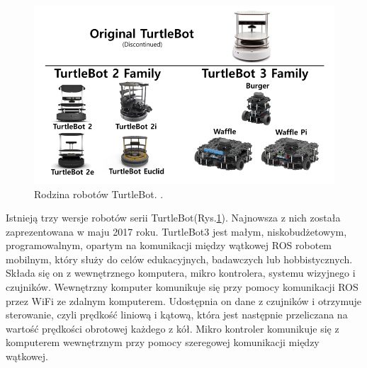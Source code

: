 \begin{figure}[ht]
	\centering
	\includegraphics[scale=0.7]{turtlebot.png}
	\caption{Rodzina robotów TurtleBot. \cite{turtlebot}.}
	\label{fig:turtlebot}
\end{figure}  

Istnieją trzy wersje robotów serii TurtleBot(Rys.\ref{fig:turtlebot}). Najnowsza z nich została zaprezentowana w maju 2017 roku. TurtleBot3 jest małym, niskobudżetowym, programowalnym, opartym na komunikacji między wątkowej ROS robotem mobilnym, który służy do celów edukacyjnych, badawczych lub hobbistycznych.  Składa się on z wewnętrznego komputera, mikro kontrolera, systemu wizyjnego i czujników.  Wewnętrzny komputer komunikuje się przy pomocy komunikacji ROS przez WiFi ze zdalnym komputerem. Udostępnia on dane z czujników i otrzymuje sterowanie, czyli prędkość liniową i kątową, która jest następnie przeliczana na wartość prędkości obrotowej każdego z kół. Mikro kontroler komunikuje się z komputerem wewnętrznym przy pomocy szeregowej komunikacji między wątkowej. 


